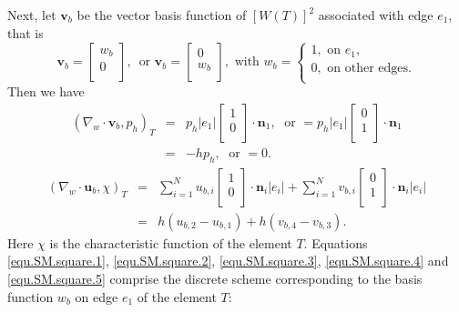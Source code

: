 \documentclass[final,leqno]{siamltex704}
\begin{document}
Next, let $\bm{v}_b$ be the vector basis function of $[W(T)]^2$ associated with edge $e_1$, that is
\begin{equation*}
\bm{v}_b =
\begin{bmatrix}
w_b\\
0 \\
\end{bmatrix},\,
\text{ or }
\bm{v}_b =
\begin{bmatrix}
0 \\
w_b \\
\end{bmatrix}, \text{ with }
w_b=\left\{
\begin{array}{lllll}
1, \text{ on } e_1,\\
0, \text{ on other edges}.\\
\end{array}
\right.
\end{equation*}
Then we have
\begin{eqnarray}
(\nabla_w\cdot \bm{v}_b,p_h)_T
&=& p_h |e_1|
\begin{bmatrix}
1 \\
0 \\
\end{bmatrix} \cdot \bm{n}_1,\;
\text{ or }
= p_h |e_1|
\begin{bmatrix}
0 \\
1 \\
\end{bmatrix} \cdot \bm{n}_1 \label{equ.SM.square.4}\\
&=& -hp_h,\; \text{ or } =0.\nonumber
\end{eqnarray}
\begin{eqnarray}
(\nabla_w\cdot \bm{u}_b,\chi)_T &=&
\sum_{i=1}^N u_{b,i}
\begin{bmatrix}
1 \\
0 \\
\end{bmatrix}\cdot \bm{n}_i|e_i|
+
\sum_{i=1}^N v_{b,i}
\begin{bmatrix}
0 \\
1 \\
\end{bmatrix}\cdot \bm{n}_i|e_i| \label{equ.SM.square.5}\\
&=&h(u_{b,2}-u_{b,1}) + h(v_{b,4}-v_{b,3}).\nonumber
\end{eqnarray}
Here $\chi$ is the characteristic function of the element $T$.
Equations \eqref{equ.SM.square.1}, \eqref{equ.SM.square.2}, \eqref{equ.SM.square.3}, \eqref{equ.SM.square.4} and \eqref{equ.SM.square.5} comprise the discrete scheme corresponding to the basis function $w_b$ on edge $e_1$ of the element $T$:
\end{document}
